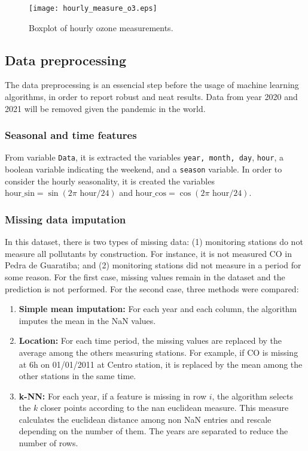 \begin{figure}[H]
    \begin{center}
        \texttt{[image: hourly\_measure\_o3.eps]}
    \end{center}
    \vspace{-0.8cm}
    \caption{Boxplot of hourly ozone measurements. }
    \label{fig:hourly-boxplot-ozone}
\end{figure}


\subsection{Data preprocessing}
\label{sec:data-preprocessing}

The data preprocessing is an essencial step before the usage of machine
learning algorithms, in order to report robust and neat results. Data from
year 2020 and 2021 will be removed given the pandemic in the world. 

\subsubsection{Seasonal and time features}

From variable {\tt Data}, it is extracted the variables {\tt year, month,
day}, {\tt hour}, a boolean variable indicating the weekend, and a {\tt season} variable. In
order to consider the hourly seasonality, it is created the variables
$\text{hour\_sin} = \sin(2\pi \text{ hour}/24)$ and $\text{hour\_cos} =
\cos(2\pi \text{ hour}/24)$. 

\subsubsection{Missing data imputation}

In this dataset, there is two types of missing data: (1) monitoring stations
do not measure all pollutants by construction. For instance, it is not
measured CO in Pedra de Guaratiba; and (2) monitoring stations did not
measure in a period for some reason. For the first case, missing values remain
in the dataset and the prediction is not performed. For the second case, three
methods were compared:  

\begin{enumerate}
    \item {\bf Simple mean imputation:} For each year and each column, the
    algorithm imputes the mean in the NaN values. 
    \item {\bf Location:} For each time period, the missing values are
    replaced by the average among the others measuring stations. For example, if
    CO is missing at 6h on 01/01/2011 at Centro station, it is replaced by the
    mean among the other stations in the same time. 
    \item {\bf k-NN:} For each year, if a feature is missing in row $i$, the
    algorithm selects the $k$ closer points according to the nan euclidean
    measure. This measure calculates the euclidean distance among non NaN
    entries and rescale depending on the number of them. The years are
    separated to reduce the number of rows.
\end{enumerate}

